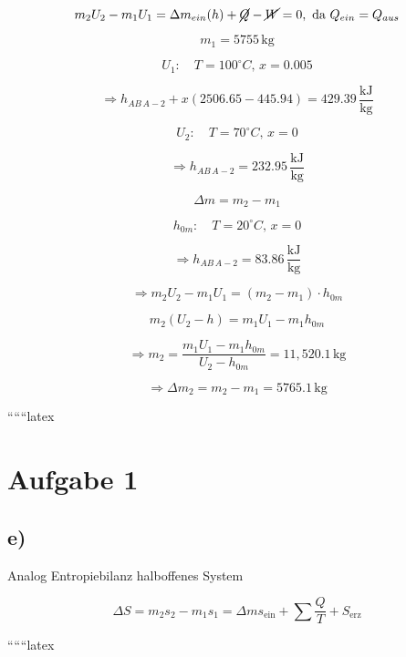 \[
m_2 U_2 - m_1 U_1 = \Delta m_{ein} (h) + \cancel{Q} - \cancel{W} = 0, \text{ da } Q_{ein} = Q_{aus}
\]

\[
m_1 = 5755 \, \text{kg}
\]

\[
U_1: \quad T = 100^\circ C, \, x = 0.005
\]

\[
\Rightarrow h_{AB \, A-2} + x (2506.65 - 445.94) = 429.39 \, \frac{\text{kJ}}{\text{kg}}
\]

\[
U_2: \quad T = 70^\circ C, \, x = 0
\]

\[
\Rightarrow h_{AB \, A-2} = 232.95 \, \frac{\text{kJ}}{\text{kg}}
\]

\[
\Delta m = m_2 - m_1
\]

\[
h_{0m}: \quad T = 20^\circ C, \, x = 0
\]

\[
\Rightarrow h_{AB \, A-2} = 83.86 \, \frac{\text{kJ}}{\text{kg}}
\]

\[
\Rightarrow m_2 U_2 - m_1 U_1 = (m_2 - m_1) \cdot h_{0m}
\]

\[
m_2 (U_2 - h) = m_1 U_1 - m_1 h_{0m}
\]

\[
\Rightarrow m_2 = \frac{m_1 U_1 - m_1 h_{0m}}{U_2 - h_{0m}} = 11,520.1 \, \text{kg}
\]

\[
\Rightarrow \Delta m_2 = m_2 - m_1 = 5765.1 \, \text{kg}
\]

``````latex


\section*{Aufgabe 1}

\subsection*{e)}
Analog Entropiebilanz halboffenes System

\[
\Delta S = m_2 s_2 - m_1 s_1 = \Delta m s_{\text{ein}} + \sum \frac{Q}{T} + S_{\text{erz}}
\]

``````latex


